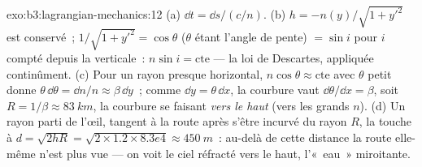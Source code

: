 \begin{solution}{exo:b3:lagrangian-mechanics:12}
(a) $\dd t = \dd s/(c/n)$. (b) $h = -n(y)/\sqrt{1 + y'^2}$ est
conservé~; $1/\sqrt{1 + y'^2} = \cos\theta$ ($\theta$ étant l'angle de pente)
$= \sin i$ pour $i$ compté depuis la verticale~: $n\sin i = \text{cte}$ ---
la loi de Descartes, appliquée continûment. (c) Pour un rayon presque horizontal,
$n\cos\theta \approx \text{cte}$ avec $\theta$ petit donne
$\theta\,\dd\theta = \dd n/n \approx \beta\,\dd y$~; comme $\dd y =
\theta\,\dd x$, la courbure vaut $\dd\theta/\dd x = \beta$, soit $R =
1/\beta \approx \qty{83}{km}$, la courbure se faisant \emph{vers le haut} (vers les grands
$n$). (d) Un rayon parti de l'œil, tangent à la route après s'être incurvé du
rayon $R$, la touche à $d = \sqrt{2hR} = \sqrt{2 \times 1.2 \times
8.3e4} \approx \qty{450}{m}$~: au-delà de cette distance la route elle-même
n'est plus vue --- on voit le ciel réfracté vers le haut, l'«~eau~» miroitante.
\end{solution}

